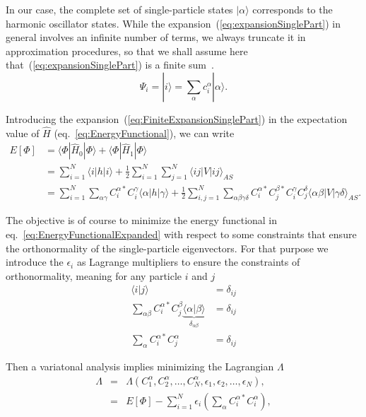 In our case, the complete set of single-particle states $| \alpha \rangle$ corresponds to the harmonic oscillator states. While the expansion~(\ref{eq:expansionSinglePart}) in general involves an infinite number of terms, we always truncate it in approximation procedures, so that we shall assume here that~(\ref{eq:expansionSinglePart}) is a finite sum~\cite{Moshinsky}.
\begin{equation}
\label{eq:FiniteExpansionSinglePart}
\Psi_i= |i \rangle = \sum_{\alpha} c_i^\alpha |\alpha \rangle.
\end{equation}


Introducing the expansion~(\ref{eq:FiniteExpansionSinglePart}) in the expectation value of $\hat{H}$ (eq.~\ref{eq:EnergyFunctional}), we can write
\begin{align}
\label{eq:EnergyFunctionalExpanded}
E[\Phi] &=  \langle \Phi |\hat{H}_0| \Phi \rangle +  \langle \Phi |\hat{H}_1| \Phi \rangle\\
&= \sum_{i=1}^N \langle i |h| i \rangle + \frac{1}{2}  \sum_{i=1}^N \sum_{j=1}^N \langle ij |V| ij \rangle_{AS} \\
&= \sum_{i=1}^N \sum_{\alpha \gamma} C_i^{\alpha *} C_i^{\gamma} \langle \alpha |h| \gamma \rangle + \frac{1}{2}   \sum_{i,j=1}^N \sum_{\alpha \beta \gamma \delta} C_i^{\alpha *} C_j^{\beta *} C_i^{\gamma} C_j^{\delta}  \langle \alpha \beta |V| \gamma \delta \rangle_{AS}.
\end{align}

The objective is of course to minimize the energy functional in eq.~\ref{eq:EnergyFunctionalExpanded} with respect to some constraints that ensure the orthonormality of the single-particle eigenvectors. For that purpose we introduce the $\epsilon_i$ as Lagrange multipliers to ensure the constraints of orthonormality, meaning for any particle $i$ and $j$
\begin{align}
\nonumber
\langle i | j \rangle &= \delta_{ij}  \\
\sum_{\alpha \beta} C_i^{\alpha *} C_j^\beta \underbrace{\langle \alpha | \beta \rangle}_{\delta_{ \alpha \beta } } &= \delta_{ij} \\
\sum_{\alpha} C_i^{\alpha *} C_j^\alpha &= \delta_{ij}
\end{align}

Then a variatonal analysis implies minimizing the Lagrangian $\Lambda$
\begin{eqnarray}
\label{eq:AuxiliaryFunction}
\Lambda &=& \Lambda(C_1^{\alpha},C_2^{\alpha},\dots,C_N^{\alpha},\epsilon_1,\epsilon_2,\dots,\epsilon_N), \\
&=& E[\Phi] - \sum_{i=1}^N \epsilon_i \left( \sum_\alpha C_i^{\alpha *} C_i^{\alpha} \right),
\end{eqnarray}

